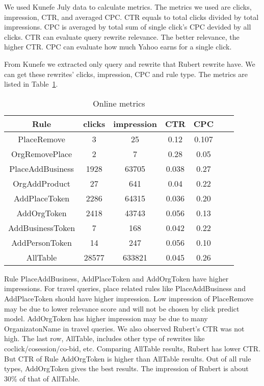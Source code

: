 \documentclass{sig-alternate}
\begin{document}
We used Kunefe July data to calculate metrics. The metrics we used are clicks, impression, CTR, and averaged CPC.  CTR equals to total clicks divided by total impressions. CPC is averaged by total sum of single click's CPC devided by all clicks. CTR can evaluate query rewrite relevance. The better relevance, the higher CTR. CPC can evaluate how much Yahoo earns for a single click. 

From Kunefe we extracted only query and rewrite that Rubert rewrite have. We can get these rewrites' clicks, impression, CPC and rule type.  The metrics are listed in Table~\ref{table:evaluation}. 

\begin{table}
\caption{Online metrics}
\begin{tabular}{|c|c|c|c|c|c|c|}  \hline 
 Rule & clicks & impression & CTR  & CPC \\ \hline
PlaceRemove & 3 & 25 & 0.12 & 0.107   \\ \hline
OrgRemovePlace & 2 & 7 & 0.28 & 0.05 \\ \hline
PlaceAddBusiness & 1928& 63705 & 0.038 & 0.27  \\ \hline
OrgAddProduct & 27&641 &0.04 &0.22   \\ \hline
AddPlaceToken & 2286 & 64315 &0.036 & 0.20 \\ \hline
AddOrgToken&  2418&43743 &0.056&0.13 \\ \hline
AddBusinessToken&7 &168&0.042&0.22 \\ \hline
AddPersonToken&14&247&0.056&0.10 \\ \hline
AllTable&28577&633821&0.045&0.26 \\ \hline	
\end{tabular}
\label{table:evaluation}
\end{table}


Rule PlaceAddBusiness, AddPlaceToken and AddOrgToken have higher impressions. For travel queries, place related rules like PlaceAddBusiness and AddPlaceToken should have higher impression. Low impression of PlaceRemove may be due to lower relevance score and will not be chosen by click predict model.  AddOrgToken has higher impression may be due to many OrganizatonName in travel queries.  We also observed Rubert's CTR was not high. The last row, AllTable, includes other type of rewrites like coclick/cosession/co-bid, etc. Comparing AllTable results, Rubert has lower CTR. But CTR of Rule AddOrgToken is higher than AllTable results.  Out of all rule types, AddOrgToken gives the best results. The impression of Rubert is about 30\% of that of  AllTable.
\end{document}
